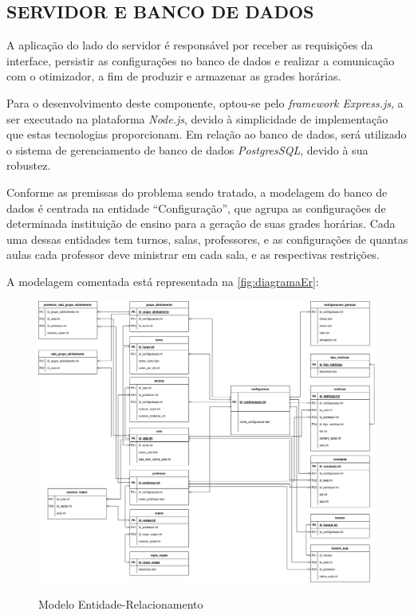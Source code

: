 \subsection{SERVIDOR E BANCO DE DADOS}

A aplicação do lado do servidor é responsável por receber as requisições da interface, persistir as configurações no banco de dados e realizar a comunicação com o otimizador, a fim de produzir e armazenar as grades horárias.

Para o desenvolvimento deste componente, optou-se pelo \textit{framework Express.js}, a ser executado na plataforma \textit{Node.js}, devido à simplicidade de implementação que estas tecnologias proporcionam. Em relação ao banco de dados, será utilizado o sistema de gerenciamento de banco de dados \textit{PostgresSQL}, devido à sua robustez.

Conforme as premissas do problema sendo tratado, a modelagem do banco de dados é centrada na entidade ``Configuração'', que agrupa as configurações de determinada instituição de ensino para a geração de suas grades horárias. Cada uma dessas entidades tem turnos, salas, professores, e as configurações de quantas aulas cada professor deve ministrar em cada sala, e as respectivas restrições.

A modelagem comentada está representada na \autoref{fig:diagramaEr}:

\begin{figure}[!htb]
	\centering
	\caption{Modelo Entidade-Relacionamento}
	\includegraphics[width=1\textwidth]{./dados/figuras/diagrama_er}
	\label{fig:diagramaEr}
\end{figure}
\newpage

